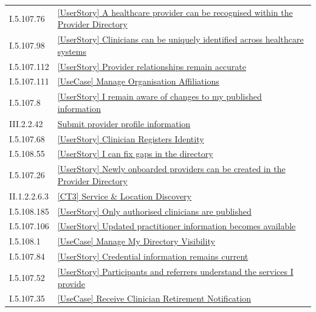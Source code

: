 \begin{longtable}{p{.22\linewidth}p{.73\linewidth}}
I.5.107.76 & \hyperref[element:83381a19f7604af2a0eb45bdbc36d012]{[UserStory] A healthcare provider can be recognised within the Provider Directory} \\
I.5.107.98 & \hyperref[element:8361262a36b84d7cb92b68b24d48c477]{[UserStory] Clinicians can be uniquely identified across healthcare systems} \\
I.5.107.112 & \hyperref[element:85e20fadcbd24f4ba006d6d4bc0314b6]{[UserStory] Provider relationships remain accurate} \\
I.5.107.111 & \hyperref[element:86021becb97040df88ee468eb9ecb00b]{[UseCase] Manage Organisation Affiliations} \\
I.5.107.8 & \hyperref[element:86fc9512c369408eb5d0f22c6fdc6324]{[UserStory] I remain aware of changes to my published information} \\
III.2.2.42 & \hyperref[element:872c6dd226d048298444d44b3ee00dca]{Submit provider profile information} \\
I.5.107.68 & \hyperref[element:877485a868ed4cf6aee4b63ff9dcf496]{[UserStory] Clinician Registers Identity} \\
I.5.108.55 & \hyperref[element:8b929e4337064dbd8973c0722e05badc]{[UserStory] I can fix gaps in the directory} \\
I.5.107.26 & \hyperref[element:8c09ffad250f47bd8f9ddf567d938b7a]{[UserStory] Newly onboarded providers can be created in the Provider Directory} \\
II.1.2.2.6.3 & \hyperref[element:8c313972197c48369767dec1a745d7fc]{[CT3] Service \& Location Discovery} \\
I.5.108.185 & \hyperref[element:8e369a19bd1c4bc08603bf82b6686c3c]{[UserStory] Only authorised clinicians are published} \\
I.5.107.106 & \hyperref[element:8f410ec951d7410ba36285ac42f3121b]{[UserStory] Updated practitioner information becomes available} \\
I.5.108.1 & \hyperref[element:907720e630e645ee93c1511de3327e60]{[UseCase] Manage My Directory Visibility} \\
I.5.107.84 & \hyperref[element:918ffa8fdab044618bdb47a5cf0522e3]{[UserStory] Credential information remains current} \\
I.5.107.52 & \hyperref[element:945b443d06fe45c08dc131d5e638b60a]{[UserStory] Participants and referrers understand the services I provide} \\
I.5.107.35 & \hyperref[element:98d5acda15a64fb8a3bb5ca19520f15f]{[UseCase] Receive Clinician Retirement Notification} \\

\end{longtable}
